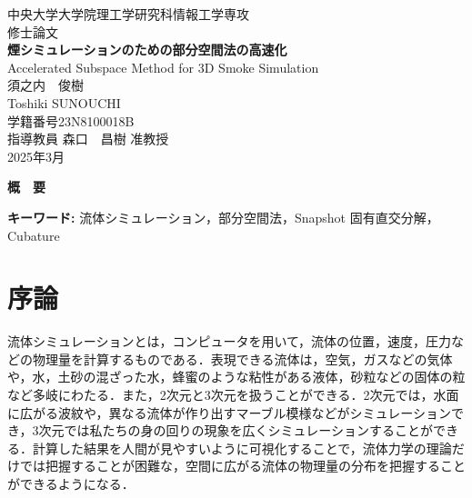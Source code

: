 \documentclass[a4j,12pt]{jreport}
\begin{document}
\thispagestyle{empty}
\begin{center}
\begin{Large}
\vspace*{0.7cm}
{\large 中央大学大学院理工学研究科情報工学専攻\\修士論文}\\
\vspace*{2.5cm}
{\LARGE\bf 煙シミュレーションのための部分空間法の高速化}\\
\vspace*{0.7cm}
{\sf Accelerated Subspace Method for 3D Smoke Simulation}\\
\vspace*{6.5cm}
須之内　俊樹\\
Toshiki SUNOUCHI\\
学籍番号\hspace*{1zw}23N8100018B\\
\vspace*{2.5cm}
指導教員\hspace*{1zw} 森口　昌樹 准教授\\
\vspace*{2.5cm}
2025年3月\\
\end{Large}
\end{center}


\newpage
\renewcommand{\baselinestretch}{1.25} \selectfont
{}


\begin{center} {\large \bf{概　要}} \end{center}

\vspace{1zw} \noindent
{\bf キーワード: }流体シミュレーション，部分空間法，Snapshot 固有直交分解，Cubature

\tableofcontents


\newpage
{}

\chapter{序論} \label{chapter:1}

流体シミュレーションとは，コンピュータを用いて，流体の位置，速度，圧力などの物理量を計算するものである．表現できる流体は，空気，ガスなどの気体や，水，土砂の混ざった水，蜂蜜のような粘性がある液体，砂粒などの固体の粒など多岐にわたる．また，2次元と3次元を扱うことができる．2次元では，水面に広がる波紋や，異なる流体が作り出すマーブル模様などがシミュレーションでき，3次元では私たちの身の回りの現象を広くシミュレーションすることができる．計算した結果を人間が見やすいように可視化することで，流体力学の理論だけでは把握することが困難な，空間に広がる流体の物理量の分布を把握することができるようになる．
\end{document}
